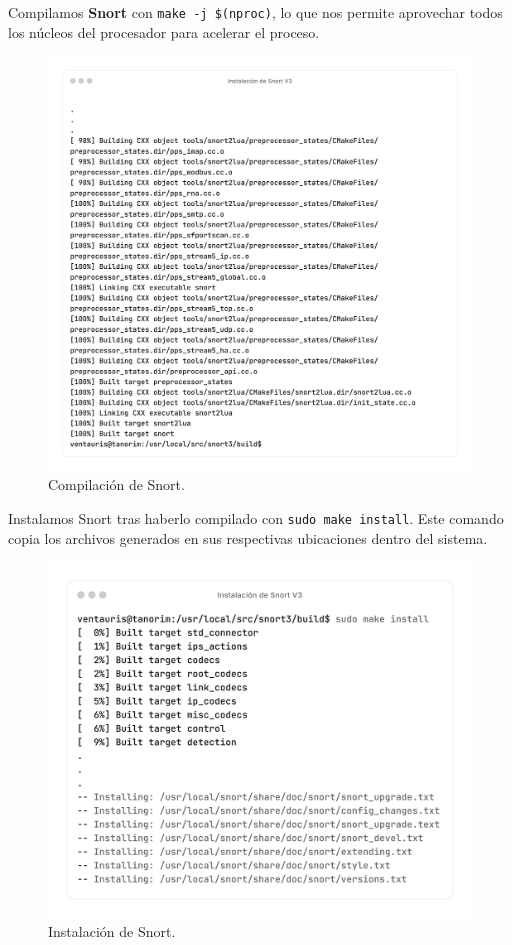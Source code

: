 \documentclass[11pt,a4paper,twoside]{report}
\begin{document}
\newpage

Compilamos \textbf{Snort} con \texttt{make -j \$(nproc)}, lo que nos permite aprovechar todos los núcleos del procesador para acelerar el proceso.

\begin{figure}[H]
	\centering
	\includegraphics[scale=0.12]{instalacion_snort/22-22.png}
	\caption{Compilación de Snort.}
\end{figure}

\newpage

Instalamos Snort tras haberlo compilado con \texttt{sudo make install}. Este comando copia los archivos generados en sus respectivas ubicaciones dentro del sistema.

\begin{figure}[H]
	\centering
	\includegraphics[scale=0.12]{instalacion_snort/23-23.png}
	\caption{Instalación de Snort.}
\end{figure}
\end{document}
